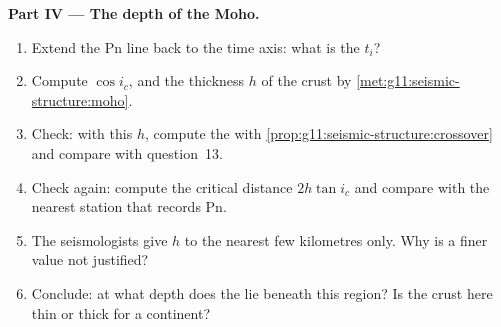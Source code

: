 \begin{problem}
\medskip
\noindent\textbf{Part IV --- The depth of the Moho.}
\begin{enumerate}[resume]
  \item Extend the Pn line back to the time axis: what is the 
        $t_i$?
  \item Compute $\cos i_c$, and the thickness $h$ of the crust by
        \cref{met:g11:seismic-structure:moho}.
  \item Check: with this $h$, compute the  with
        \cref{prop:g11:seismic-structure:crossover} and compare with
        question~13.
  \item Check again: compute the critical distance $2h\tan i_c$ and compare
        with the nearest station that records Pn.
  \item The seismologists give $h$ to the nearest few kilometres only. Why
        is a finer value not justified?
  \item Conclude: at what depth does the  lie beneath this region? Is the
        crust here thin or thick for a continent?
\end{enumerate}
\end{problem}
